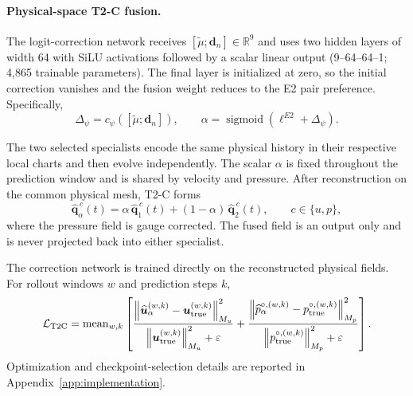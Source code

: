 \documentclass{article}
\begin{document}
\paragraph{Physical-space T2-C fusion.}
The logit-correction network receives
$[\widetilde\mu;\bm d_n]\in\mathbb R^9$ and uses two hidden layers of width 64 with SiLU
activations followed by a scalar linear output (9--64--64--1; 4,865 trainable parameters).
The final layer is initialized at zero, so the initial correction vanishes
and the fusion weight reduces to the E2 pair preference.
Specifically,
\begin{equation}
  \Delta_\psi
  =
  c_\psi
  \left(
    [\widetilde\mu;\bm d_n]
  \right),
  \qquad
  \alpha
  =
  \operatorname{sigmoid}
  \left(
    \ell^{E2}+\Delta_\psi
  \right).
  \label{eq:app_t2c_gate}
\end{equation}

The two selected specialists encode the same physical history in their
respective local charts and then evolve independently.
The scalar $\alpha$ is fixed throughout the prediction window and is shared
by velocity and pressure.
After reconstruction on the common physical mesh, T2-C forms
\begin{equation}
  \widehat{\bm q}_{\alpha}^{\,c}(t)
  =
  \alpha\,
  \widehat{\bm q}_{1}^{\,c}(t)
  +
  (1-\alpha)\,
  \widehat{\bm q}_{2}^{\,c}(t),
  \qquad
  c\in\{u,p\},
  \label{eq:app_t2c_field_fusion}
\end{equation}
where the pressure field is gauge corrected.
The fused field is an output only and is never projected back into either
specialist.

The correction network is trained directly on the reconstructed physical
fields. For rollout windows $w$ and prediction steps $k$,
\begin{equation}
  \mathcal L_{\rm T2C}
  =
  \operatorname{mean}_{w,k}
  \left[
    \frac{
      \left\|
        \widehat{\bm u}_{\alpha}^{(w,k)}
        -
        \bm u_{\rm true}^{(w,k)}
      \right\|_{M_u}^2
    }{
      \left\|
        \bm u_{\rm true}^{(w,k)}
      \right\|_{M_u}^2+\varepsilon
    }
    +
    \frac{
      \left\|
        \widehat p_{\alpha}^{\circ,(w,k)}
        -
        p_{\rm true}^{\circ,(w,k)}
      \right\|_{M_p}^2
    }{
      \left\|
        p_{\rm true}^{\circ,(w,k)}
      \right\|_{M_p}^2+\varepsilon
    }
  \right].
  \label{eq:app_t2c_loss}
\end{equation}
Optimization and checkpoint-selection details are reported in
Appendix~\ref{app:implementation}.
\end{document}
